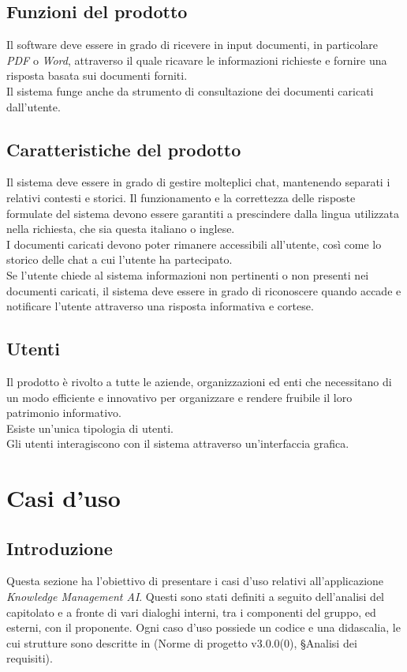 \documentclass[10pt, a4paper]{article}
\begin{document}
\subsection{Funzioni del prodotto}
Il software deve essere in grado di ricevere in input documenti, in particolare \textit{PDF} o \textit{Word}, attraverso il quale ricavare le informazioni richieste e fornire una risposta basata sui documenti forniti.\\
Il sistema funge anche da strumento di consultazione dei documenti caricati dall'utente.
\subsection{Caratteristiche del prodotto}
Il sistema deve essere in grado di gestire molteplici chat, mantenendo separati i relativi contesti e storici. 
Il funzionamento e la correttezza delle risposte formulate del sistema devono essere garantiti a prescindere dalla lingua utilizzata nella richiesta, che sia questa italiano o inglese.\\
I documenti caricati devono poter rimanere accessibili all'utente, così come lo storico delle chat a cui l'utente ha partecipato.\\
Se l'utente chiede al sistema informazioni non pertinenti o non presenti nei documenti caricati, il sistema deve essere in grado di riconoscere quando accade e notificare l'utente attraverso una risposta informativa e cortese.
\subsection{Utenti}
Il prodotto è rivolto a tutte le aziende, organizzazioni ed enti che necessitano di un modo efficiente e innovativo per organizzare e rendere fruibile il loro patrimonio informativo.\\
Esiste un'unica tipologia di utenti.\\
Gli utenti interagiscono con il sistema attraverso un'interfaccia grafica.
\newpage

\section{Casi d'uso}

\subsection{Introduzione}
Questa sezione ha l'obiettivo di presentare i casi d'uso relativi all'applicazione \textit{Knowledge Management AI}. Questi sono stati definiti a seguito dell'analisi del capitolato e a fronte di vari dialoghi interni, tra i componenti del gruppo, ed esterni, con il proponente. Ogni caso d'uso possiede un codice e una didascalia, le cui strutture sono descritte in (Norme di progetto v3.0.0(0), \S Analisi dei requisiti).
\end{document}
